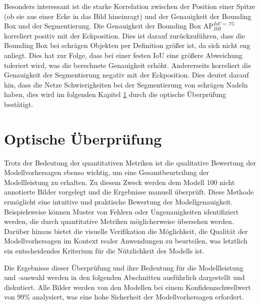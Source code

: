 Besonders interessant ist die starke Korrelation zwischen der Position einer Spitze (ob sie aus einer Ecke in das Bild hineinragt) und der Genauigkeit der Bounding Box und der Segmentierung. Die Genauigkeit der Bounding Box $\text{AP}^{IoU=.75}_{BB}$ korreliert positiv mit der Eckposition. Dies ist darauf zurückzuführen, dass die Bounding Box bei schrägen Objekten per Definition größer ist, da sich nicht eng anliegt. Dies hat zur Folge, dass bei einer festen IoU eine größere Abweichung toleriert wird, was die berechnete Genauigkeit erhöht.
Andererseits korreliert die Genauigkeit der Segmentierung negativ mit der Eckposition. Dies deutet darauf hin, dass die Netze Schwierigkeiten bei der Segmentierung von schrägen Nadeln haben, dies wird im folgenden Kapitel \ref{sec:optkon} durch die optische Überprüfung bestätigt.

\clearpage
\section{Optische Überprüfung}
\label{sec:optkon}
Trotz der Bedeutung der quantitativen Metriken ist die qualitative Bewertung der Modellvorhersagen ebenso wichtig, um eine Gesamtbeurteilung der Modellleistung zu erhalten. Zu diesem Zweck werden dem Modell 100 nicht annotierte Bilder vorgelegt und die Ergebnisse manuell überprüft.
Diese Methode ermöglicht eine intuitive und praktische Bewertung der Modellgenauigkeit. Beispielsweise können Muster von Fehlern oder Ungenauigkeiten identifiziert werden, die durch quantitative Metriken möglicherweise übersehen werden. Darüber hinaus bietet die visuelle Verifikation die Möglichkeit, die Qualität der Modellvorhersagen im Kontext realer Anwendungen zu beurteilen, was letztlich ein entscheidendes Kriterium für die Nützlichkeit des Modells ist.

Die Ergebnisse dieser Überprüfung und ihre Bedeutung für die Modellleistung und -auswahl werden in den folgenden Abschnitten ausführlich dargestellt und diskutiert.
Alle Bilder werden von den Modellen bei einem Konfidenzschwellwert von 99\% analysiert, was eine hohe Sicherheit der Modellvorhersagen erfordert.

\newpage

